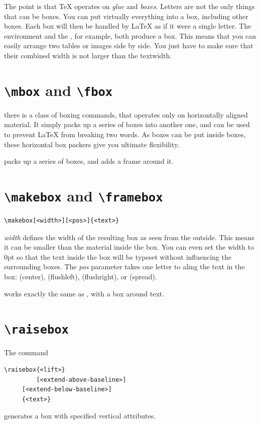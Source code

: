 \documentclass[a4paper,oneside]{book}
\newcommand{\argument}[1]{\textit{#1}}
\newcommand{\syntax}[1]{\PVerb{#1}}
\newcommand{\command}[1]{\PVerb{#1}}
\begin{document}
The point is that \TeX{} operates on \emph{glue} and \emph{boxes}. Letters are not the only things that can be boxes. You can put virtually everything into a box, including other boxes. Each box will then be handled by \LaTeX{} as if it were a single letter.
The \syntax{tabular} environment and the \syntax{\includegraphics}, for example, both produce a box. This means that you can easily arrange two tables or images side by side. You just have to make sure that their combined width is not larger than the textwidth.

\section{\texttt{\textbackslash mbox} and \texttt{\textbackslash fbox}}
there is a class of boxing commands, that operates only on horizontally aligned material. It simply packs up a series of boxes into another one, and can be used to prevent \LaTeX{} from breaking two words. As boxes can be put inside boxes, these horizontal box packers give you ultimate flexibility.

\syntax{\mbox} packs up a series of boxes, and \syntax{\fbox} adds a frame around it.

\section{\texttt{\textbackslash makebox} and \texttt{\textbackslash framebox}}
\begin{lstlisting}
\makebox[<width>][<pos>]{<text>}
\end{lstlisting}
\argument{width} defines the width of the resulting box as seen from the outside. This means it can be smaller than the material inside the box. You can even set the width to 0pt so that the text inside the box will be typeset without influencing the surrounding boxes.
The \argument{pos} parameter takes one letter to aling the text in the box: \syntax{c} (center), \syntax{l} (flushleft), \syntax{r} (flushright), or \syntax{s} (spread).

\command{\framebox} works exactly the same as \command{\makebox}, with a box around text.

\section{\texttt{\textbackslash raisebox}}
The command
\begin{lstlisting}[deletecomment={[s]{<}{>}},columns=fixed]
\raisebox{<lift>}
         [<extend-above-baseline>]
	 [<extend-below-baseline>]
	 {<text>}
\end{lstlisting}
generates a box with specified vertical attributes.
\end{document}
